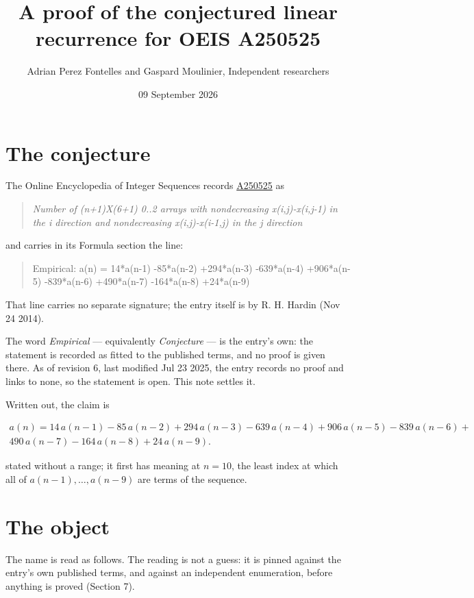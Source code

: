 \documentclass[11pt]{article}
\title{A proof of the conjectured linear recurrence for OEIS A250525}
\author{Adrian Perez Fontelles and Gaspard Moulinier, Independent researchers}
\date{09 September 2026}
\theoremstyle{definition}
\begin{document}
\maketitle
\section{The conjecture}

The Online Encyclopedia of Integer Sequences records \href{https://oeis.org/A250525}{A250525} as

\begin{quote}\itshape Number of (n+1)X(6+1) 0..2 arrays with nondecreasing x(i,j)-x(i,j-1) in the i direction and nondecreasing x(i,j)-x(i-1,j) in the j direction\end{quote}

and carries in its Formula section the line:

\begin{quote}\ttfamily Empirical: a(n) = 14*a(n-1) -85*a(n-2) +294*a(n-3) -639*a(n-4) +906*a(n-5) -839*a(n-6) +490*a(n-7) -164*a(n-8) +24*a(n-9)\end{quote}

That line carries no separate signature; the entry itself is by R. H. Hardin (Nov 24 2014).

The word {\itshape Empirical} --- equivalently {\itshape Conjecture} --- is the entry's own: the statement is recorded as fitted to the published terms, and no proof is given there. As of revision 6, last modified Jul 23 2025, the entry records no proof and links to none, so the statement is open. This note settles it.

Written out, the claim is

\begin{multline*} a(n) = 14\,a(n-1) - 85\,a(n-2) + 294\,a(n-3) - 639\,a(n-4) + 906\,a(n-5) - 839\,a(n-6) + \\ 490\,a(n-7) - 164\,a(n-8) + 24\,a(n-9). \end{multline*}

stated without a range; it first has meaning at $n = 10$, the least index at which all of $a(n-1),\dots,a(n-9)$ are terms of the sequence.

\section{The object}

The name is read as follows. The reading is not a guess: it is pinned against the entry's own published terms, and against an independent enumeration, before anything is proved (Section 7).
\end{document}
